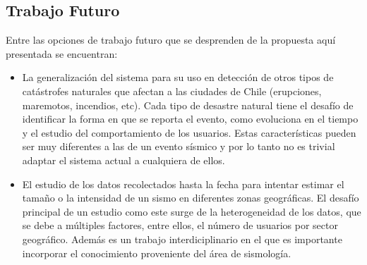 \begin{conclusion}
\section{Trabajo Futuro}

Entre las opciones de trabajo futuro que se desprenden de la propuesta aquí presentada se encuentran: 
\begin{itemize}
\item La generalización del sistema para su uso en detección de otros tipos de catástrofes naturales que afectan a las ciudades de Chile (erupciones, maremotos, incendios, etc). Cada tipo de desastre natural tiene el desafío de identificar la forma en que se reporta el evento, como evoluciona en el tiempo y el estudio del comportamiento de los usuarios. Estas características pueden ser muy diferentes a las de un evento sísmico y por lo tanto no es trivial adaptar el sistema actual a cualquiera de ellos. 
\item El estudio de los datos recolectados hasta la fecha para intentar estimar el tamaño o la intensidad de un sismo en diferentes zonas geográficas. El desafío principal de un estudio como este surge de la heterogeneidad de los datos, que se debe a múltiples factores, entre ellos, el número de usuarios por sector geográfico.   Además es un trabajo interdiciplinario en el que es importante incorporar el conocimiento proveniente del área de sismología.
\end{itemize}

\end{conclusion}

